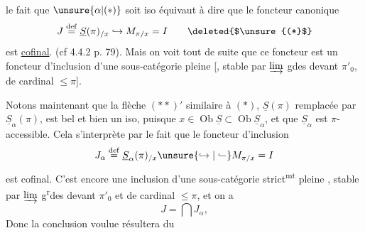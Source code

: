 
le fait que $\unsure{\alpha|(*)}$ soit iso équivaut à dire
que le foncteur  canonique
\[
J\overset{\mathrm{def}}{=}\underline S(\pi)_{/x}\hookrightarrow M_{\pi/x}=I
\tag*{\deleted{$\unsure{(*}$}}
\]
est \uline{cofinal}. (cf 4.4.2 p. 79). \deleted{\unsure{[}}Mais
on voit tout de suite que ce foncteur
est un foncteur d'inclusion d'une sous-catégorie  pleine [, stable par $\varinjlim$ gdes
devant $\pi'_0$, de cardinal $\leq\pi$].

Notons maintenant que la flèche
$(**)'$ similaire à $(*)$,  $\underline S(\pi)$
remplacée par $\underline S_\alpha(\pi)$, est bel et bien
un iso, puisque $x\in\operatorname{Ob}\underline S\subset\operatorname{Ob}\underline S_\alpha$,
et que $\underline S_\alpha$ est $\pi$-accessible. Cela
s'interprète par le fait que le foncteur
d'inclusion
\[
J_\alpha\overset{\mathrm{def}}{=}\underline S_\alpha(\pi)_{/x}\unsure{\hookrightarrow|\lhook\joinrel\relbar}M_{\pi/x}=I
\]
est cofinal. C'est encore une inclusion
 d'une sous-catégorie  strict\textsuperscript{mt} pleine ,
stable par $\varinjlim$ g\textsuperscript{r}des devant $\pi'_0$ et de
cardinal $\leq\pi$, et on a
\[
J=\bigcap J_\alpha,
\]
Donc la conclusion voulue résultera du
